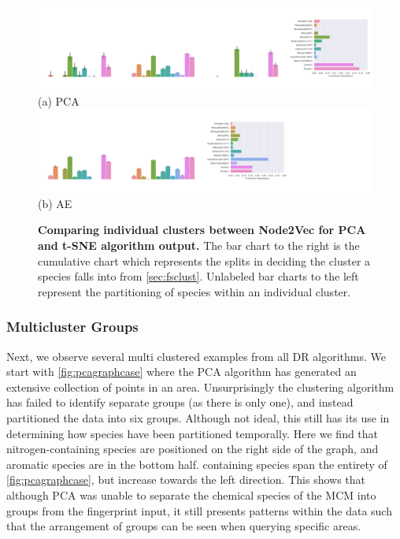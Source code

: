 \begin{landscape}
\begin{figure}[H]
         \includegraphics[width=1.6\textheight]{./outputs/PCA/node2vec/group.png}
         \\ (a) PCA \\
     \hfill
            \includegraphics[width=1.6\textheight]{./outputs/AE/node2vec/group.png}
        \\ (b) AE
        \caption{ \textbf{Comparing individual clusters between Node2Vec for PCA and t-SNE algorithm output.} The bar chart to the right is the cumulative chart which represents the splits in deciding the cluster a species falls into from \autoref{sec:fsclust}. Unlabeled bar charts to the left represent the partitioning of species within an individual cluster.}
        \label{fig:biN2V}
\end{figure}
\end{landscape}



\subsubsection{Multicluster Groups}\label{sec:multigroups}

Next, we observe several multi clustered examples from all DR algorithms. We start with \autoref{fig:pcagraphcase} where the PCA algorithm has generated an extensive collection of points in an area. Unsurprisingly the clustering algorithm has failed to identify separate groups (as there is only one), and instead partitioned the data into six groups. Although not ideal, this still has its use in determining how species have been partitioned temporally. Here we find that nitrogen-containing species are positioned on the right side of the graph, and aromatic species are in the bottom half.  containing species span the entirety of \autoref{fig:pcagraphcase}, but increase towards the left direction. This shows that although PCA was unable to separate the chemical species of the MCM into groups from the fingerprint input, it still presents patterns within the data such that the arrangement of groups can be seen when querying specific areas.





